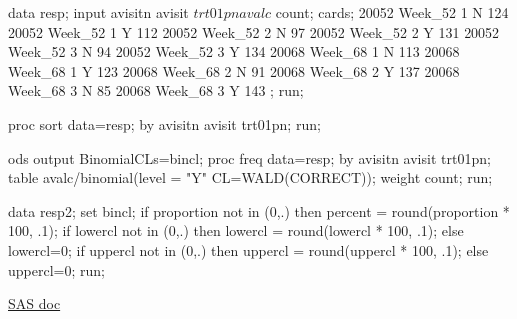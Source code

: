 \documentclass[
]{book}
\newenvironment{Shaded}{\begin{snugshade}}{\end{snugshade}}
\newcommand{\BaseNTok}[1]{\textcolor[rgb]{0.00,0.00,0.81}{#1}}
\newcommand{\NormalTok}[1]{#1}
\begin{document}
\begin{Shaded}
\begin{Highlighting}[]
\NormalTok{data resp;}
\BaseNTok{    input avisitn avisit $ trt01pn avalc $ count;}
\BaseNTok{    cards;}
\BaseNTok{    20052 Week_52 1 N 124}
\BaseNTok{    20052 Week_52 1 Y 112}
\BaseNTok{    20052 Week_52 2 N 97}
\BaseNTok{    20052 Week_52 2 Y 131}
\BaseNTok{    20052 Week_52 3 N 94}
\BaseNTok{    20052 Week_52 3 Y 134}
\BaseNTok{    20068 Week_68 1 N 113}
\BaseNTok{    20068 Week_68 1 Y 123}
\BaseNTok{    20068 Week_68 2 N 91}
\BaseNTok{    20068 Week_68 2 Y 137}
\BaseNTok{    20068 Week_68 3 N 85}
\BaseNTok{    20068 Week_68 3 Y 143}
\BaseNTok{    ;}
\NormalTok{run;}

\NormalTok{proc sort data=resp;}
\BaseNTok{    by avisitn avisit trt01pn;}
\NormalTok{run;}

\NormalTok{ods output BinomialCLs=bincl;  }
\NormalTok{proc freq data=resp;}
\BaseNTok{    by avisitn avisit trt01pn;}
\BaseNTok{    table avalc/binomial(level = "Y" CL=WALD(CORRECT)); }
\BaseNTok{    weight count;}
\NormalTok{run;}

\NormalTok{data resp2;}
\BaseNTok{    set bincl;}
\BaseNTok{    if proportion not in (0,.) then percent = round(proportion * 100, .1);}
\BaseNTok{    if lowercl not in (0,.) then lowercl = round(lowercl * 100, .1); }
\BaseNTok{    else lowercl=0;}
\BaseNTok{    if uppercl not in (0,.) then uppercl = round(uppercl * 100, .1); }
\BaseNTok{    else uppercl=0;}
\NormalTok{run;}
\end{Highlighting}
\end{Shaded}

\href{https://documentation.sas.com/?cdcId=pgmsascdc\&cdcVersion=9.4_3.5\&docsetId=procstat\&docsetTarget=procstat_freq_syntax08.htm\&locale=en\#procstat.freq.freqbwald}{SAS doc}

  
\end{document}
